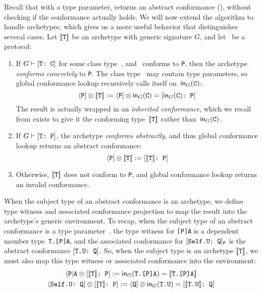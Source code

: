 \documentclass[../generics]{subfiles}
\begin{document}
Recall that with a type parameter,  returns an abstract conformance (), without checking if the conformance actually holds. We will now extend the algorithm to handle archetypes, which gives us a more useful behavior that distinguishes several cases. Let $[\![\texttt{T}]\!]$ be an archetype with generic signature $G$, and let \tP\ be a protocol:
\begin{enumerate}
\item If $G\vdash[\texttt{T:~C}]$ for some class type~\tC, and \tC\ conforms to \texttt{P}, then the archetype \emph{conforms concretely} to \texttt{P}. The class type \tC\ may contain type parameters, so global conformance lookup recursively calls itself on~$\mathsf{in}_G(\texttt{C})$:
\[\langle\texttt{P}] \otimes [\![\texttt{T}]\!] := \langle\texttt{P}] \otimes \mathsf{in}_G(\texttt{C})=[\texttt{$\mathsf{in}_G(\texttt{C})$:~P}]\]
The result is actually wrapped in an \emph{inherited conformance}, which we recall from  exists to give it the conforming type~$[\![\texttt{T}]\!]$ rather than~$\mathsf{in}_G(\texttt{C})$.
\item If $G\vdash[\texttt{T:~P}]$, the archetype \emph{conforms abstractly}, and thus global conformance lookup returns an abstract conformance:
\[\langle\texttt{P}]\otimes[\![\texttt{T}]\!] := [\texttt{$[\![\texttt{T}]\!]$:~P}]\]
\item Otherwise, $[\![\texttt{T}]\!]$ does not conform to \texttt{P}, and global conformance lookup returns an invalid conformance.
\end{enumerate}
When the subject type of an abstract conformance is an archetype, we define type witness and associated conformance projection to map the result into the archetype's generic environment. To recap, when the subject type of an abstract conformance is a type parameter~\tT, the type witness for \texttt{[P]A} is a dependent member type~\texttt{T.[P]A}, and the associated conformance for $[\texttt{Self.U:~Q}]_{\texttt{P}}$ is the abstract conformance $[\texttt{T.U:~Q}]$. So, when the subject type is an archetype $[\![\texttt{T}]\!]$, we must also map this type witness or associated conformance into the environment:
\begin{gather*}
\AssocType{P}{A}\otimes \ConfReq{$\archetype{T}$}{P} := \MapIn(\texttt{T.[P]A}) =\archetype{T.[P]A}\\
\AssocConf{Self.U}{Q}\otimes \ConfReq{$\archetype{T}$}{P} := \PQ\otimes\MapIn(\texttt{T.U})=\ConfReq{$\archetype{T.U}$}{Q}
\end{gather*}
\end{document}
